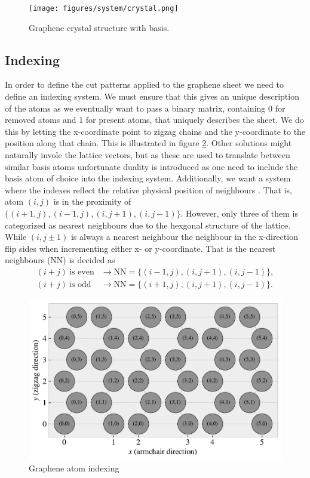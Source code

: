 \begin{figure}[H]
  \centering
  \texttt{[image: figures/system/crystal.png]}
  \caption{Graphene crystal structure with basis.}
  \label{fig:graphene_crystal}
\end{figure}



\subsection{Indexing}
In order to define the cut patterns applied to the graphene sheet we need to
define an indexing system. We must ensure that this gives an unique description
of the atoms as we eventually want to pass a binary matrix, containing 0 for
removed atoms and 1 for present atoms, that uniquely describes the sheet. We do
this by letting the x-coordinate point to zigzag chains and the y-coordinate to
the position along that chain. This is illustrated in figure
\ref{fig:atom_indexing}. Other solutions might naturally invole the lattice
vectors, but as these are used to translate between similar basis atoms
unfortunate duality is introduced as one need to include the basis atom of
choice into the indexing system. Additionally, we want a system where the
indexes reflect the relative physical position of neighbours . That is, atom
$(i, j)$ is in the proximity of $\{(i+1, j), (i-1, j), (i, j+1), (i, j-1)\}$.
However, only three of them is categorized as nearest neighbours due to the
hexgonal structure of the lattice. While $(i, j\pm 1)$ is always a nearest
neighbour the neighbour in the x-direction flip sides when incrementing either
x- or y-coordinate. That is the nearest neighbours (NN) is decided as
\begin{equation}
  \begin{aligned}
    (i + j) \ \text{is even} &\rightarrow \text{NN} = \{(i-1, j), (i, j+1), (i, j-1)\}, \\
    (i + j) \ \text{is odd} &\rightarrow \text{NN} = \{(i+1, j), (i, j+1), (i, j-1)\}.
  \end{aligned}
  \label{eq:atom_neigh_idx}
\end{equation}


\begin{figure}[H]
  \centering
  \includegraphics[width=0.7\linewidth]{figures/system/atom_indexing.pdf}
  \caption{Graphene atom indexing}
  \label{fig:atom_indexing}
\end{figure}



